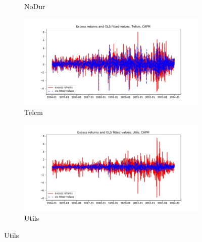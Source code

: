 \documentclass{article}
\begin{document}
\begin{figure}
\begin{subfigure}[b]{0.5\textwidth}
    \caption{NoDur}
    \label{fig:2}
  \end{subfigure}
  \begin{subfigure}[b]{0.5\textwidth}
    \centering
    \includegraphics[width=\textwidth]{Telcm/fitted_CAPM.jpg}
    \caption{Telcm}
    \label{fig:2}
  \end{subfigure}
  \begin{subfigure}[b]{0.5\textwidth}
    \centering
    \includegraphics[width=\textwidth]{Utils/fitted_CAPM.jpg}
    \caption{Utils}
    \label{fig:2}
  \end{subfigure}
\end{figure}

\newpage
\end{document}
